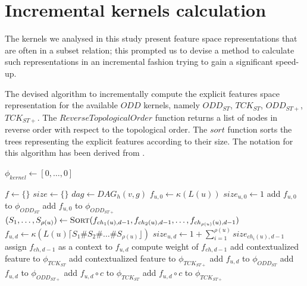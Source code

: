 \section{Incremental kernels calculation} 
\label{sec:inc}
The kernels we analysed in this study present feature space representations
that are often in a subset relation; this prompted us to devise a method to
calculate such representations in an incremental fashion trying to gain a
significant speed-up.

\begin{algorithm}
    \caption{The devised algorithm to incrementally compute the explicit
    features space representation for the available $ODD$ kernels, namely
    $ODD_{ST}$, $TCK_{ST}$, $ODD_{ST+}$, $TCK_{ST+}$.
    The $ReverseTopologicalOrder$ function returns a list of nodes in reverse
    order with respect to the topological order.
    The $sort$ function sorts the trees representing the explicit features
    according to their size.
    The notation for this algorithm has been derived from \cite{rtesselli}.
    }
    \label{alg:incremental}
    \begin{algorithmic}[1]
            \State $\phi_{kernel} \gets [0,\dots,0]$
        \EndFor

            \State $f \gets \{\}$
            \State $size \gets \{\}$
            \State $dag \gets DAG_h(v, g)$
                        \State $f_{u,0} \gets \kappa(L(u))$
                        \State $size_{u,0} \gets 1$
                        \State add $f_{u,0}$ to $\phi_{ODD_{ST}}$
                        \State add $f_{u,0}$ to $\phi_{ODD_{ST+}}$
                    \Else
                        \State $(S_1,\dots,S_{\rho(u)}) \gets \Call{Sort}{
                        f_{ch_1(u),d-1},f_{ch_2(u),d-1},\dots,f_{ch_{\rho(u)}(u),d-1}}$
                        \State $f_{u,d} \gets \kappa(L(u)\lceil{}S_1\#S_2\#\dots\#S_{\rho(u)}\rfloor)$
                        \State $size_{u,d} \gets 1 + \sum_{i=1}^{\rho(u)}size_{ch_i(u),d-1}$
                            \State assign $f_{ch,d-1}$ as a context to $f_{u,d}$
                            \State compute weight of $f_{ch,d-1}$
                            \State add contextualized feature to $\phi_{TCK_{ST}}$
                            \State add contextualized feature to $\phi_{TCK_{ST+}}$
                        \EndFor
                        \State add $f_{u,d}$ to $\phi_{ODD_{ST}}$
                        \State add $f_{u,d}$ to $\phi_{ODD_{ST+}}$
                    \EndIf
                        \State add $f_{u,d}\circ{}c$ to $\phi_{TCK_{ST}}$
                        \State add $f_{u,d}\circ{}c$ to $\phi_{TCK_{ST+}}$
                    \EndIf


\end{algorithmic}
\end{algorithm}
